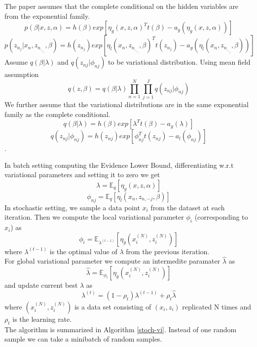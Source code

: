 \documentclass{article} %
\begin{document}
        The paper assumes that the complete conditional on the hidden variables are from the exponential family.
        $$p(\beta | x,z,\alpha) = h(\beta)exp[\eta_g(x,z,\alpha)^T t(\beta) - a_g(\eta_g(x,z,\alpha))] $$
        $$p(z_n_j | x_n, z_n_,_-_j, \beta ) = h(z_n_j)exp[\eta_l(x_n, z_n_,_-_j, \beta)^T t(z_n_j) - a_g(\eta_l(x_n, z_n_,_-_j, \beta))]$$
        Assume $q(\beta | \lambda)$ and $q(z_{nj} | \phi_{nj})$ to be variational distribution. Using mean field assumption $$q(z, \beta) = q(\beta | \lambda)\prod_{n=1}^N \prod_{j=1}^J q(z_{nj} | \phi_{nj}) $$ We further assume that the variational distributions are in the same exponential family as the complete conditional. $$q(\beta | \lambda) = h(\beta)exp[\lambda^Tt(\beta) - a_g(\lambda)] $$
        $$q(z_{nj} | \phi_{nj}) = h(z_{nj})exp[ \phi_{nj}^Tt( z_{nj}) - a_l( \phi_{nj}) ]$$.
        
        In batch setting computing the Evidence Lower Bound, differentiating w.r.t variational parameters and setting it to zero we get $$\lambda = \mathbb{E}_q[\eta_g(x,z,\alpha)]$$ $$\phi_{nj} = \mathbb{E}_q[\eta_l(x_n, z_{n,-j}, \beta)]$$
        In stochastic setting, we sample a data point $x_i$ from the dataset at each iteration. Then we compute the local variational parameter $\phi_i$ (corresponding to $x_i$) as$$\phi_{i} = \mathbb{E}_{\lambda^{(t-1)}}[\eta_g(x_i^{(N)}, z_i^{(N)})]$$ where $\lambda^{(t-1)}$ is the optimal value of $\lambda$ from the previous iteration.\\
        For global variational parameter we compute an intermedite paramater $\hat{\lambda}$ as $$\hat{\lambda} = \mathbb{E}_{\phi_i}[\eta_g(x_i^{(N)}, z_i^{(N)})]$$ and update current best $\lambda$ as $$\lambda^{(t)} = (1-\rho_t)\lambda^{(t-1)} + \rho_t \hat{\lambda}$$ where $(x_i^{(N)}, z_i^{(N)})$ is a data set consisting of $(x_i,z_i)$ replicated N times and $\rho_t$ is the learning rate. \\
        The algorithm is summarized in Algorithm \ref{stoch-vi}. Instead of one random sample we can take a minibatch of random samples.
\end{document}
